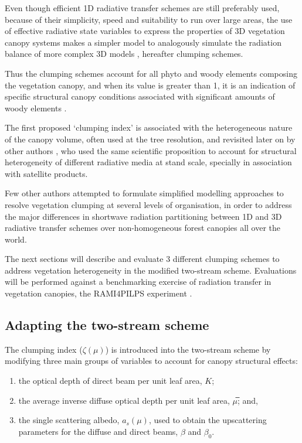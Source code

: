 Even though efficient 1D radiative transfer schemes are still preferably used, because of their simplicity, speed and suitability to run over large areas, the use of effective radiative state variables to express the properties of 3D vegetation canopy systems makes a simpler model to analogously simulate the radiation balance of more complex 3D models \citep{Pinty2004,pinty2006}, hereafter clumping schemes.

Thus the clumping schemes  account for all phyto and woody elements composing the vegetation canopy, and when its value is greater than 1, it is an indication of specific structural canopy conditions associated with significant amounts of woody elements \citep{pinty2006}. 

The first proposed `clumping index' \citep{Nilson1971,Norman1974,chen1992,Chen1996} is associated with the heterogeneous nature of the canopy volume, often used at the tree resolution, and revisited later on by other authors \citep{Pinty2004,pinty2006}, who used the same scientific proposition to account for structural heterogeneity of different radiative media at stand scale, specially in association with satellite products.

Few other authors \citep{Kucharik1999,pinty2006,Ni-Meister2010} attempted to formulate simplified modelling approaches to resolve vegetation clumping at several levels of organisation, in order to address the major differences in shortwave radiation partitioning between 1D and 3D radiative transfer schemes over non-homogeneous forest canopies all over the world.

The next sections will describe and evaluate 3 different clumping schemes to address vegetation heterogeneity in the modified two-stream scheme. Evaluations will be performed against a benchmarking exercise of radiation transfer in vegetation canopies, the RAMI4PILPS experiment \citep{Widlowski2011}.

\subsection{Adapting the two-stream scheme}

The clumping index ($\zeta(\mu)$) is introduced into the two-stream scheme by modifying three main groups of variables to account for canopy structural effects:

\begin{enumerate}
\item the optical depth of direct beam per unit leaf area, $K$; 
\item the average inverse diffuse optical depth per unit leaf area, $\mu$̅; and, 
\item the single scattering albedo, $a_s(\mu)$, used to obtain the upscattering parameters for the diffuse and direct beams, $\beta$ and $\beta_0$.
\end{enumerate}

